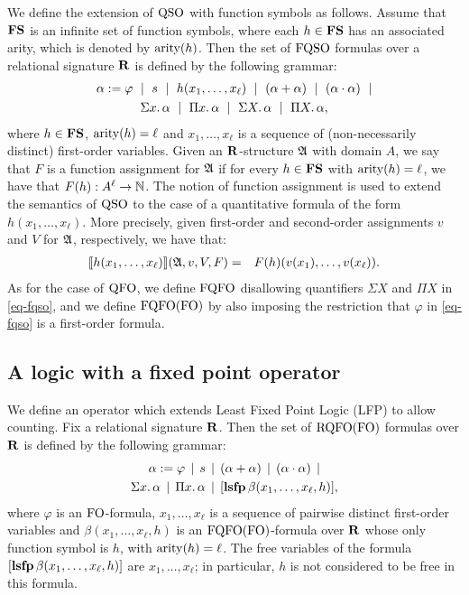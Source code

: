 
We define the extension of ${\rm QSO}$ with function symbols as follows. Assume that $\mathbf{FS}$ is an infinite set of function symbols, where each $h \in \mathbf{FS}$ has an associated arity, which is denoted by ${\rm arity}(h)$. Then the set of ${\rm FQSO}$ formulas over a relational signature $\mathbf{R}$ is defined by the following grammar:
\begin{multline}
\label{eq-fqso}
	\alpha := \varphi \ \mid \  s \  \mid \  h(x_1, \ldots, x_\ell) \  \mid \
	(\alpha \add \alpha) \  \mid\  (\alpha \mult \alpha) \  \mid \\  
	\sa{x} \alpha \  \mid \
	\pa{x} \alpha \  \mid \
	\sa{X} \alpha \  \mid \
	\pa{X} \alpha,
\end{multline}
where $h \in \mathbf{FS}$, ${\rm arity}(h) = \ell$ and $x_1, \ldots, x_\ell$ is a sequence of (non-necessarily distinct) first-order variables. Given an $\mathbf{R}$-structure $\mathfrak{A}$ with domain $A$, we say that $F$ is a function assignment for $\mathfrak{A}$ if for every $h \in \mathbf{FS}$ with ${\rm arity}(h) = \ell$, we have that $F(h) :  A^\ell \to \mathbb{N}$. The notion of function assignment is used to extend the semantics of ${\rm QSO}$ to the case of a quantitative formula of the form $h(x_1, \ldots, x_\ell)$. More precisely, given first-order and second-order assignments $v$ and $V$ for $\mathfrak{A}$, respectively, 
we have that:
\begin{eqnarray*}
{\llbracket{}{h(x_1, \ldots, x_\ell)}\rrbracket}(\mathfrak{A},v,V,F) & = & F(h)(v(x_1),\ldots, v(x_\ell)).
\end{eqnarray*}
As for the case of ${\rm QFO}$, we define ${\rm FQFO}$ disallowing quantifiers $\Sigma X$ and $\Pi X$ in \eqref{eq-fqso}, and we define ${\rm FQFO}({\rm FO})$ by also imposing the restriction that $\varphi$ in \eqref{eq-fqso} is a first-order formula.


\subsection{A logic with a fixed point operator}

We define an operator which extends Least Fixed Point Logic (LFP) \cite{I86,vardi1982complexity} to allow counting. 
Fix a relational signature $\mathbf{R}$. Then the set of ${\rm RQFO}({\rm FO})$ formulas over $\mathbf{R}$ is defined by the following grammar:
\begin{multline*}
	\alpha := \varphi \, \mid \, s \, \mid \, (\alpha + \alpha) \, \mid\, (\alpha \cdot \alpha) \, \mid \\
	\Sigma{x}.\, \alpha \, \mid\, 
	\Pi{x}.\, \alpha \, \mid\,
	[{\bf lsfp} \, \beta(x_1, \ldots, x_\ell, h)],
\end{multline*}
where $\varphi$ is an ${\rm FO}$-formula, $x_1, \ldots, x_\ell$ is a sequence of pairwise distinct first-order variables and $\beta(x_1, \ldots, x_\ell, h)$ is an ${\rm FQFO}({\rm FO})$-formula over $\mathbf{R}$ whose only function symbol is $h$, with ${\rm arity}(h) = \ell$. The free variables of the formula $[{\bf lsfp} \, \beta(x_1,\ldots,x_\ell,h)]$ are $x_1, \ldots, x_\ell$; in particular, $h$ is not considered to be free in this formula.

